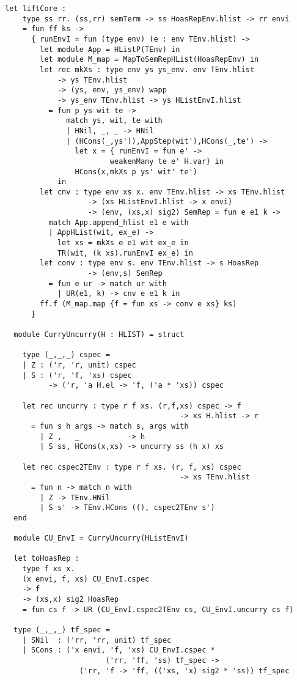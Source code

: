 \documentclass[uplatex]{sumiilab-paper}
\theoremstyle{mystyle}
\numberwithin{definition}{chapter} %
\begin{document}
\begin{lstlisting}[caption=OCaml版EbUの実装,label=src:unembedding_ocaml]
  let liftCore : 
    type ss rr. (ss,rr) semTerm -> ss HoasRepEnv.hlist -> rr envi 
    = fun ff ks -> 
      { runEnvI = fun (type env) (e : env TEnv.hlist) -> 
        let module App = HListP(TEnv) in
        let module M_map = MapToSemRepHList(HoasRepEnv) in  
        let rec mkXs : type env ys ys_env. env TEnv.hlist 
            -> ys TEnv.hlist
            -> (ys, env, ys_env) wapp 
            -> ys_env TEnv.hlist -> ys HListEnvI.hlist 
          = fun p ys wit te -> 
              match ys, wit, te with 
              | HNil, _, _ -> HNil 
              | (HCons(_,ys')),AppStep(wit'),HCons(_,te') ->
                let x = { runEnvI = fun e' -> 
                        weakenMany te e' H.var} in 
                HCons(x,mkXs p ys' wit' te') 
            in                       
        let cnv : type env xs x. env TEnv.hlist -> xs TEnv.hlist 
                   -> (xs HListEnvI.hlist -> x envi)
                   -> (env, (xs,x) sig2) SemRep = fun e e1 k -> 
          match App.append_hlist e1 e with
          | AppHList(wit, ex_e) -> 
            let xs = mkXs e e1 wit ex_e in 
            TR(wit, (k xs).runEnvI ex_e) in 
        let conv : type env s. env TEnv.hlist -> s HoasRep 
                   -> (env,s) SemRep 
          = fun e ur -> match ur with 
            | UR(e1, k) -> cnv e e1 k in      
        ff.f (M_map.map {f = fun xs -> conv e xs} ks)
      }

  module CurryUncurry(H : HLIST) = struct
  
    type (_,_,_) cspec = 
    | Z : ('r, 'r, unit) cspec 
    | S : ('r, 'f, 'xs) cspec 
          -> ('r, 'a H.el -> 'f, ('a * 'xs)) cspec 
  
    let rec uncurry : type r f xs. (r,f,xs) cspec -> f 
                                        -> xs H.hlist -> r 
      = fun s h args -> match s, args with  
        | Z ,   _           -> h 
        | S ss, HCons(x,xs) -> uncurry ss (h x) xs   

    let rec cspec2TEnv : type r f xs. (r, f, xs) cspec 
                                        -> xs TEnv.hlist 
      = fun n -> match n with   
        | Z -> TEnv.HNil 
        | S s' -> TEnv.HCons ((), cspec2TEnv s')
  end
  
  module CU_EnvI = CurryUncurry(HListEnvI)

  let toHoasRep : 
    type f xs x. 
    (x envi, f, xs) CU_EnvI.cspec
    -> f   
    -> (xs,x) sig2 HoasRep
    = fun cs f -> UR (CU_EnvI.cspec2TEnv cs, CU_EnvI.uncurry cs f)

  type (_,_,_) tf_spec =
    | SNil  : ('rr, 'rr, unit) tf_spec 
    | SCons : ('x envi, 'f, 'xs) CU_EnvI.cspec * 
                       ('rr, 'ff, 'ss) tf_spec ->
                 ('rr, 'f -> 'ff, (('xs, 'x) sig2 * 'ss)) tf_spec 


\end{lstlisting}
\end{document}
